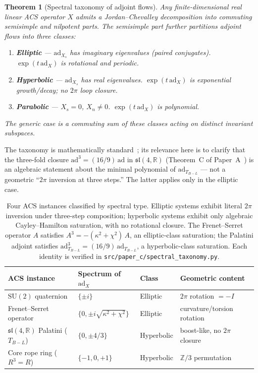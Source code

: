 \documentclass[11pt,a4paper]{article}
\theoremstyle{plain}
\newtheorem{theorem}{Theorem}[section]
\theoremstyle{definition}
\theoremstyle{remark}
\begin{document}
\begin{theorem}[Spectral taxonomy of adjoint flows]\label{thm:taxonomy}
Any finite-dimensional real linear ACS operator $X$ admits a
Jordan--Chevalley decomposition into commuting semisimple and
nilpotent parts.  The semisimple part further partitions adjoint
flows into three classes:
\begin{enumerate}[label=(\roman*)]
  \item \textbf{Elliptic} --- $\mathrm{ad}_{X_s}$ has imaginary
    eigenvalues (paired conjugates).  $\exp(t\,\mathrm{ad}_X)$ is
    rotational and periodic.
  \item \textbf{Hyperbolic} --- $\mathrm{ad}_{X_s}$ has real eigenvalues.
    $\exp(t\,\mathrm{ad}_X)$ is exponential growth/decay; no $2\pi$ loop
    closure.
  \item \textbf{Parabolic} --- $X_s = 0$, $X_n \neq 0$.
    $\exp(t\,\mathrm{ad}_X)$ is polynomial.
\end{enumerate}
The generic case is a commuting sum of these classes acting on
distinct invariant subspaces.
\end{theorem}

\noindent
The taxonomy is mathematically standard~\cite{Jacobson1979,Bourbaki1989};
its relevance here is to clarify that the three-fold closure
$\mathrm{ad}^3 = (16/9)\,\mathrm{ad}$ in $\mathfrak{sl}(4,\mathbb{R})$
(Theorem~C of Paper~A~\cite{Wallace2026a}) is an algebraic statement
about the minimal polynomial of $\mathrm{ad}_{T_{B-L}}$ --- not a
geometric ``$2\pi$ inversion at three steps.''  The latter applies
only in the elliptic case.

\begin{table}[h]
\centering\small
\begin{tabular}{@{}llll@{}}
\toprule
ACS instance & Spectrum of $\mathrm{ad}_X$ & Class & Geometric content \\
\midrule
$\mathrm{SU}(2)$ quaternion & $\{\pm i\}$ & Elliptic & $2\pi$ rotation $= -I$ \\
Frenet--Serret operator & $\{0, \pm i\sqrt{\kappa^2{+}\chi^2}\}$ & Elliptic & curvature/torsion rotation \\
$\mathfrak{sl}(4,\mathbb{R})$ Palatini ($T_{B-L}$) & $\{0, \pm 4/3\}$ & Hyperbolic & boost-like, no $2\pi$ closure \\
Core rope ring ($R^3 = R$) & $\{-1, 0, +1\}$ & Hyperbolic & $\mathbb{Z}/3$ permutation \\
\bottomrule
\end{tabular}
\caption{Four ACS instances classified by spectral type.  Elliptic
systems exhibit literal $2\pi$ inversion under three-step
composition; hyperbolic systems exhibit only algebraic Cayley--Hamilton
saturation, with no rotational closure.  The Frenet--Serret operator
$A$ satisfies $A^3 = -(\kappa^2 + \chi^2)\,A$, an elliptic-class
saturation; the Palatini adjoint satisfies $\mathrm{ad}_{T_{B-L}}^3 =
(16/9)\,\mathrm{ad}_{T_{B-L}}$, a hyperbolic-class saturation.  Each
identity is verified in \texttt{src/paper\_c/spectral\_taxonomy.py}.}
\label{tab:spectral-classes}
\end{table}
\end{document}
